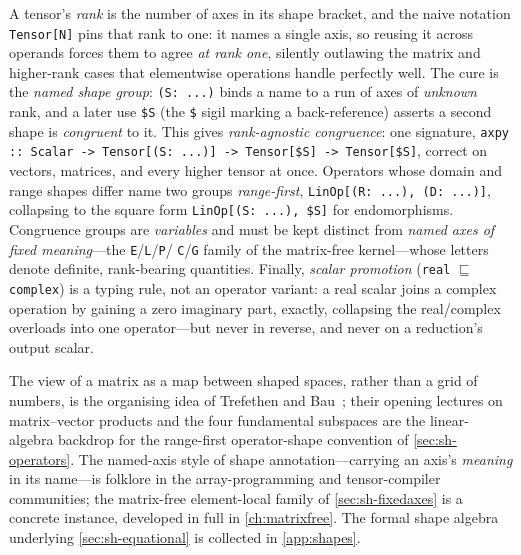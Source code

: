 \summarysection
A tensor's \emph{rank} is the number of axes in its shape bracket, and the
naive notation \lstinline[style=l4style]|Tensor[N]| pins that rank to one: it
names a single axis, so reusing it across operands forces them to agree
\emph{at rank one}, silently outlawing the matrix and higher-rank cases that
elementwise operations handle perfectly well. The cure is the \emph{named
shape group}: \lstinline[style=l4style]|(S: ...)| binds a name to a run of axes
of \emph{unknown} rank, and a later use \lstinline[style=l4style]|$S| (the
\texttt{\$} sigil marking a back-reference) asserts a second shape is
\emph{congruent} to it. This gives \emph{rank-agnostic congruence}: one
signature, \lstinline[style=l4style]|axpy :: Scalar -> Tensor[(S: ...)] -> Tensor[$S] -> Tensor[$S]|,
correct on vectors, matrices, and every higher tensor at once. Operators whose
domain and range shapes differ name two groups \emph{range-first},
\lstinline[style=l4style]|LinOp[(R: ...), (D: ...)]|, collapsing to the square
form \lstinline[style=l4style]|LinOp[(S: ...), $S]| for endomorphisms.
Congruence groups are \emph{variables} and must be kept distinct from
\emph{named axes of fixed meaning}---the \texttt{E}/\texttt{L}/\texttt{P}/%
\texttt{C}/\texttt{G} family of the matrix-free kernel---whose letters denote
definite, rank-bearing quantities. Finally, \emph{scalar promotion}
(\texttt{real} $\sqsubseteq$ \texttt{complex}) is a typing rule, not an
operator variant: a real scalar joins a complex operation by gaining a zero
imaginary part, exactly, collapsing the real/complex overloads into one
operator---but never in reverse, and never on a reduction's output scalar.

\furtherreading
The view of a matrix as a map between shaped spaces, rather than a grid of
numbers, is the organising idea of Trefethen and
Bau~\citep{trefethenbau1997}; their opening lectures on matrix--vector
products and the four fundamental subspaces are the linear-algebra backdrop for
the range-first operator-shape convention of \cref{sec:sh-operators}. The
named-axis style of shape annotation---carrying an axis's \emph{meaning} in its
name---is folklore in the array-programming and tensor-compiler communities;
the matrix-free element-local family of \cref{sec:sh-fixedaxes} is a concrete
instance, developed in full in \cref{ch:matrixfree}. The formal shape algebra
underlying \cref{sec:sh-equational} is collected in \cref{app:shapes}.

